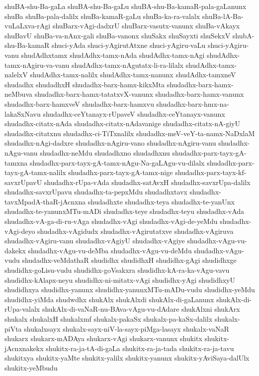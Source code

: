 {shuBA-shu-Ba-gaLa
shuBA-shu-Ba-gaLu
shuBA-shu-Ba-kamaR-pala-gaLanunx
shuBa
shuBa-pala-dalilx
shuBa-kamaR-gaLu
shuBa-ka-ra-valalx
shuBa-lA-Ba-vuLaLxva-rAgi
shuBarx-vAgi-dadxrU
shuBarx-vasutx-vanunx
shuBa-vAkayx
shuBavU
shuBa-va-nAnx-gali
shuBa-vanonx
shuSakx
shuSayxti
shuSekxV
shubA-shu-Ba-kamaR
shuci-yAda
shuci-yAgirutAtxne
shuci-yAgiru-vaLu
shuci-yAgiru-vanu
shudAdhxtamx
shudAdhx-tamx-nAda
shudAdhx-tamx-nAgi
shudAdhx-tamx-nAgiru-va-vanu
shudAdhx-tamx-nAgutatx-li-ra-lilalx
shudAdhx-tamx-nalelxV
shudAdhx-tamx-nalilx
shudAdhx-tamx-nanunx
shudAdhx-tamxneV
shudadhx
shudadhxH
shudadhx-barx-hamx-kikxMta
shudadhx-barx-hamx-neMbuva
shudadhx-barx-hamx-tatatxvX-vanunx
shudadhx-barx-hamx-vanunx
shudadhx-barx-hamxveV
shudadhx-barx-hamxvu
shudadhx-barx-hmx-na-lakaSxNavu
shudadhx-ceYtanayx-rUpaveV
shudadhx-ceYtanayx-vanunx
shudadhx-citatx-nAda
shudadhx-citatx-nAdavanige
shudadhx-citatx-nA-giyU
shudadhx-citatxnu
shudadhx-ci-TiTxnalilx
shudadhx-meV-veY-ta-namx-NaDxlaM
shudadhx-nAgi-dadxre
shudadhx-nAgiru-vano
shudadhx-nAgiru-vanu
shudadhx-nAgu-vanu
shudadhx-neMdu
shudadhxno
shudadhxnu
shudadhx-parx-tayx-gA-tamxna
shudadhx-parx-tayx-gA-tamx-nAgu-Na-gaLAgu-vu-dilalx
shudadhx-parx-tayx-gA-tamx-nalilx
shudadhx-parx-tayx-gA-tamx-nige
shudadhx-parx-tayx-kf-savxrUpavU
shudadhx-rUpa-vAda
shudadhx-satAvxH
shudadhx-savxrUpa-dalilx
shudadhx-savxrUpavu
shudadhx-ta-pepxMdu
shudadhxtavx
shudadhx-tavxMpadA-thaR-jAcnxna
shudadhxte
shudadhx-teya
shudadhx-te-yanUnx
shudadhx-te-yanunxMTu-mADi
shudadhx-teye
shudadhx-teyu
shudadhx-vAda
shudadhx-vA-ga-di-ru-vAga
shudadhx-vAgi
shudadhx-vAgi-de-yeMdu
shudadhx-vAgi-deyo
shudadhx-vAgidudx
shudadhx-vAgirutatxve
shudadhx-vAgiruva
shudadhx-vAgiru-vanu
shudadhx-vAgiyU
shudadhx-vAgiye
shudadhx-vAgu-vu-dakekx
shudadhx-vAgu-vu-deMba
shudadhx-vAgu-vu-deMdu
shudadhx-vAgu-vudu
shudadhx-veMdathaR
shudidhx
shudidhxH
shudidhx-gAgi
shudidhxge
shudidhx-goLisu-vudu
shudidhx-goVsakxra
shudidhx-kA-ra-ka-vAgu-vavu
shudidhx-kAlapx-neyu
shudidhx-ni-mitatx-vAgi
shudidhx-yAgi
shudidhxyU
shudidhxya
shudidhx-yanunx
shudidhx-yanunxMTu-mADu-vudu
shudidhx-yeMdu
shudidhx-yiMda
shudwdhx
shukAlx
shukAlxdi
shukAlx-di-gaLanunx
shukAlx-di-rUpa-valalx
shukAlx-di-vaNaR-nu-BAva-vAgu-vu-dAdare
shukAlxni
shukArx
shukalx
shukalxH
shukalxmf
shukalx-pakaSx
shukalx-pa-kaSx-dalilx
shukalx-piVta
shukalxsayx
shukalx-sayx-niV-la-sayx-piMga-lasayx
shukalx-vaNaR
shukarx
shukarx-mADAya
shukarx-vAgi
shukarx-vanunx
shukitx
shukitx-jAcnxnakekx
shukitx-ra-ja-tA-di-gaLa
shukitx-ra-ja-tada
shukitx-ra-ja-tavu
shukitxya
shukitx-yaMte
shukitx-yalilx
shukitx-yanunx
shukitx-yAviSaya-dalUlx
shukitx-yeMbudu
}
